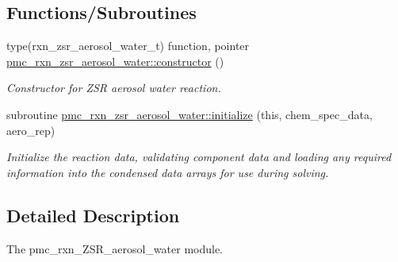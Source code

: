 \subsection*{Functions/\+Subroutines}
\begin{DoxyCompactItemize}
\item 
type(rxn\+\_\+zsr\+\_\+aerosol\+\_\+water\+\_\+t) function, pointer \mbox{\hyperlink{namespacepmc__rxn__zsr__aerosol__water_a3ceff195484eeb2afb745aeb4ab31ddb}{pmc\+\_\+rxn\+\_\+zsr\+\_\+aerosol\+\_\+water\+::constructor}} ()
\begin{DoxyCompactList}\small\item\em Constructor for Z\+SR aerosol water reaction. \end{DoxyCompactList}\item 
subroutine \mbox{\hyperlink{namespacepmc__rxn__zsr__aerosol__water_ad28f0d91114d117e54d04c9b3cbe21dc}{pmc\+\_\+rxn\+\_\+zsr\+\_\+aerosol\+\_\+water\+::initialize}} (this, chem\+\_\+spec\+\_\+data, aero\+\_\+rep)
\begin{DoxyCompactList}\small\item\em Initialize the reaction data, validating component data and loading any required information into the condensed data arrays for use during solving. \end{DoxyCompactList}\end{DoxyCompactItemize}


\subsection{Detailed Description}
The pmc\+\_\+rxn\+\_\+\+Z\+S\+R\+\_\+aerosol\+\_\+water module. 

